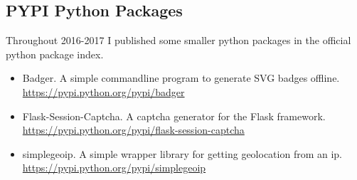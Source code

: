 \documentclass[a4paper,10pt]{article}
\begin{document}
\subsection{PYPI Python Packages}
Throughout 2016-2017 I published some smaller python packages in the official python package index.

\begin{itemize}
\item Badger. A simple commandline program to generate SVG badges offline.\\ \href{https://pypi.python.org/pypi/badger}{https://pypi.python.org/pypi/badger}
\item Flask-Session-Captcha. A captcha generator for the Flask framework.\\ \href{https://pypi.python.org/pypi/flask-session-captcha}{https://pypi.python.org/pypi/flask-session-captcha}
\item simplegeoip. A simple wrapper library for getting geolocation from an ip.\\ \href{https://pypi.python.org/pypi/simplegeoip}{https://pypi.python.org/pypi/simplegeoip}
\end{itemize}
\end{document}
